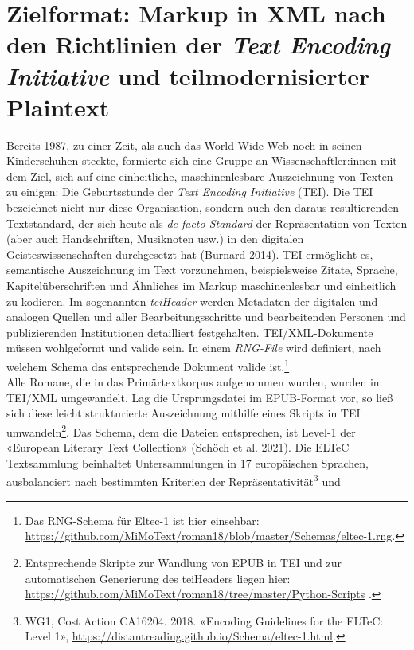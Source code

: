 \documentclass[
  12pt,
  letterpaper,
  DIV=11,
  numbers=noendperiod]{scrreprt}
\begin{document}
\section{\texorpdfstring{Zielformat: Markup in XML nach den Richtlinien
der \emph{Text Encoding Initiative} und teilmodernisierter
Plaintext}{Zielformat: Markup in XML nach den Richtlinien der Text Encoding Initiative und teilmodernisierter Plaintext}}\label{zielformat-markup-in-xml-nach-den-richtlinien-der-text-encoding-initiative-und-teilmodernisierter-plaintext}

Bereits 1987, zu einer Zeit, als auch das World Wide Web noch in seinen
Kinderschuhen steckte, formierte sich eine Gruppe an
Wissenschaftler:innen mit dem Ziel, sich auf eine einheitliche,
maschinenlesbare Auszeichnung von Texten zu einigen: Die Geburtsstunde
der \emph{Text Encoding Initiative} (TEI). Die TEI bezeichnet nicht nur
diese Organisation, sondern auch den daraus resultierenden Textstandard,
der sich heute als \emph{de facto Standard} der Repräsentation von
Texten (aber auch Handschriften, Musiknoten usw.) in den digitalen
Geisteswissenschaften durchgesetzt hat (Burnard 2014). TEI ermöglicht
es, semantische Auszeichnung im Text vorzunehmen, beispielsweise Zitate,
Sprache, Kapitelüberschriften und Ähnliches im Markup maschinenlesbar
und einheitlich zu kodieren. Im sogenannten \emph{teiHeader} werden
Metadaten der digitalen und analogen Quellen und aller
Bearbeitungsschritte und bearbeitenden Personen und publizierenden
Institutionen detailliert festgehalten. TEI/XML-Dokumente müssen
wohlgeformt und valide sein. In einem \emph{RNG-File} wird definiert,
nach welchem Schema das entsprechende Dokument valide ist.\footnote{Das
  RNG-Schema für Eltec-1 ist hier einsehbar:
  \url{https://github.com/MiMoText/roman18/blob/master/Schemas/eltec-1.rng}.}\\
Alle Romane, die in das Primärtextkorpus aufgenommen wurden, wurden in
TEI/XML umgewandelt. Lag die Ursprungsdatei im EPUB-Format vor, so ließ
sich diese leicht strukturierte Auszeichnung mithilfe eines Skripts in
TEI umwandeln\footnote{Entsprechende Skripte zur Wandlung von EPUB in
  TEI und zur automatischen Generierung des teiHeaders liegen hier:
  \url{https://github.com/MiMoText/roman18/tree/master/Python-Scripts} .}.
Das Schema, dem die Dateien entsprechen, ist Level-1 der «European
Literary Text Collection» (Schöch et al. 2021). Die ELTeC Textsammlung
beinhaltet Untersammlungen in 17 europäischen Sprachen, ausbalanciert
nach bestimmten Kriterien der Repräsentativität\footnote{WG1, Cost
  Action CA16204. 2018. «Encoding Guidelines for the ELTeC: Level 1»,
  \url{https://distantreading.github.io/Schema/eltec-1.html}.} und
\end{document}
